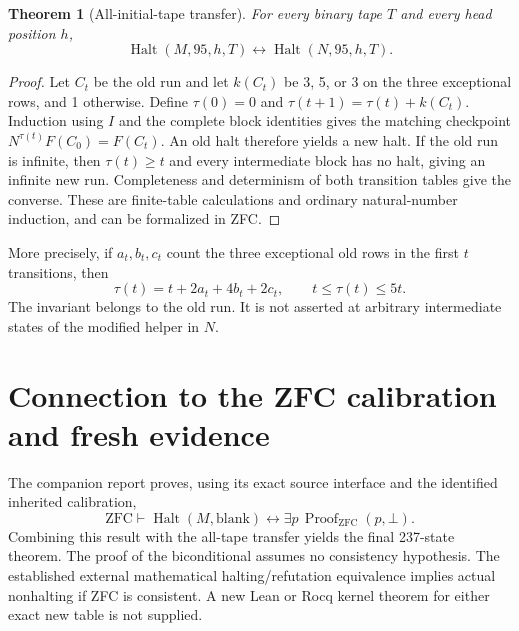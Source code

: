 \documentclass[11pt]{article}
\newtheorem{theorem}{Theorem}
\newcommand{\Halt}{\operatorname{Halt}}
\newcommand{\ZFC}{\mathrm{ZFC}}
\begin{document}
\begin{theorem}[All-initial-tape transfer]
For every binary tape $T$ and every head position $h$,
\[
 \Halt(M,95,h,T)\longleftrightarrow\Halt(N,95,h,T).
\]
\end{theorem}
\begin{proof}
Let $C_t$ be the old run and let $k(C_t)$ be 3, 5, or 3 on the three
exceptional rows, and 1 otherwise.  Define $\tau(0)=0$ and
$\tau(t+1)=\tau(t)+k(C_t)$.  Induction using $I$ and the complete block
identities gives the matching checkpoint $N^{\tau(t)}F(C_0)=F(C_t)$.
An old halt therefore yields a new halt.  If the old run is infinite,
then $\tau(t)\ge t$ and every intermediate block has no halt, giving an
infinite new run.  Completeness and determinism of both transition tables
give the converse.  These are finite-table calculations and ordinary
natural-number induction, and can be formalized in ZFC.
\end{proof}

More precisely, if $a_t,b_t,c_t$ count the three exceptional old rows in
the first $t$ transitions, then
\[
 \tau(t)=t+2a_t+4b_t+2c_t,\qquad t\le\tau(t)\le5t.
\]
The invariant belongs to the old run.  It is not asserted at arbitrary
intermediate states of the modified helper in $N$.

\section{Connection to the ZFC calibration and fresh evidence}

The companion report proves, using its exact source interface and the
identified inherited calibration,
\[
 \ZFC\vdash \Halt(M,\mathrm{blank})
 \longleftrightarrow\exists p\,\operatorname{Proof}_{\ZFC}(p,\bot).
\]
Combining this result with the all-tape transfer yields the final
237-state theorem.  The proof of the biconditional assumes no consistency
hypothesis.  The established external mathematical halting/refutation
equivalence implies actual nonhalting if ZFC is consistent.  A new Lean
or Rocq kernel theorem for either exact new table is not supplied.
\end{document}
